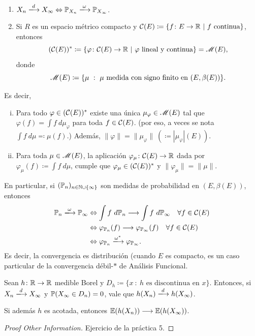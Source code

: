 \begin{remark}~
	\begin{enumerate}
		\item $X_{n} \xlongrightarrow{d} X_{\infty} \iff \mbb{P}_{X_{n}} \xlongrightarrow{\omega} \mbb{P}_{X_{\infty}}$.
		
		\item Si $R$ es un espacio métrico compacto y $\mathcal{C}(E) \coloneq \{f \colon E \to \mathbb{R} \ | \ f \text{ continua}\}$, entonces
		\[ (\mathcal{C}(E))^{*} \coloneq \{\varphi \colon \mathcal{C}(E) \to \mathbb{R} \ | \ \varphi \text{ lineal y continua}\} = \mathscr{M}(E), \]
		donde
		\[ \mathscr{M}(E) \coloneq \{\mu \ : \ \mu \text{ medida con signo finito en } (E, \beta(E))\}. \] 
	\end{enumerate}
	Es decir,
	\begin{enumerate}[i.]
		\item Para todo $\varphi \in (\mathcal{C}(E))^{*}$ existe una única $\mu_{\varphi} \in \mathscr{M}(E)$ tal que $\varphi(f) = \int f \ d\mu_{\varphi}$ para toda $f \in \mathcal{C}(E)$. (por eso, a veces se nota $\int f \ d\mu \eqcolon \mu(f)$.) Además, $\| \varphi \| = \| \mu_{\varphi} \| \ (\coloneq |\mu_{\varphi}|(E))$.
		
		\item Para toda $\mu \in \mathscr{M}(E)$, la aplicación $\varphi_{\mu} \colon \mathcal{C}(E) \to \mathbb{R}$ dada por $\varphi_{\mu}(f) \coloneq \int f \ d\mu$, cumple que $\varphi_{\mu} \in (\mathcal{C}(E))^{*}$ y $\| \varphi_{\mu} \| = \| \mu \|$.
	\end{enumerate}
	En particular, si $(\mathbb{P}_{n})_{n \in \mathbb{N} \cup \{\infty\}}$ son medidas de probabilidad en $(E, \beta(E))$, entonces
	\begin{align*}
		\mbb{P}_{n} \xlongrightarrow{\omega} \mbb{P}_{\infty} &\iff \int f \ d\mbb{P}_{n} \longrightarrow \int f \ d\mbb{P}_{\infty} \quad \forall f \in \mcal{C}(E) \\
		&\iff \varphi_{\mbb{P}_{n}}(f) \longrightarrow \varphi_{\mbb{P}_{\infty}}(f) \quad \forall f \in \mcal{C}(E) \\
		&\iff \varphi_{\mbb{P}_{n}} \xlongrightarrow{\omega^{*}} \varphi_{\mbb{P}_{\infty}}
	.\end{align*}
	Es decir, la convergencia es distribución (cuando $E$ es compacto, es un caso particular de la convergencia débil-$*$ de Análisis Funcional.
\end{remark}

\begin{theorem}
	Sean $h \colon \mathbb{R} \to \mathbb{R}$ medible Borel y $D_{h} \coloneq \{x \ : \ h \text{ es discontinua en } x\}$. Entonces, si $X_{n} \xlongrightarrow{d} X_{\infty}$ y $\mathbb{P}(X_{\infty} \in D_{n}) = 0$, vale que $h(X_{n}) \xlongrightarrow{d} h(X_{\infty})$. \par
	Si además $h$ es acotada, entonces $\mathbb{E}(h(X_{n})) \longrightarrow \mathbb{E}(h(X_{\infty}))$.
\end{theorem}
\begin{proof}[Proof Other Information]
	Ejercicio de la práctica 5.
\end{proof}

